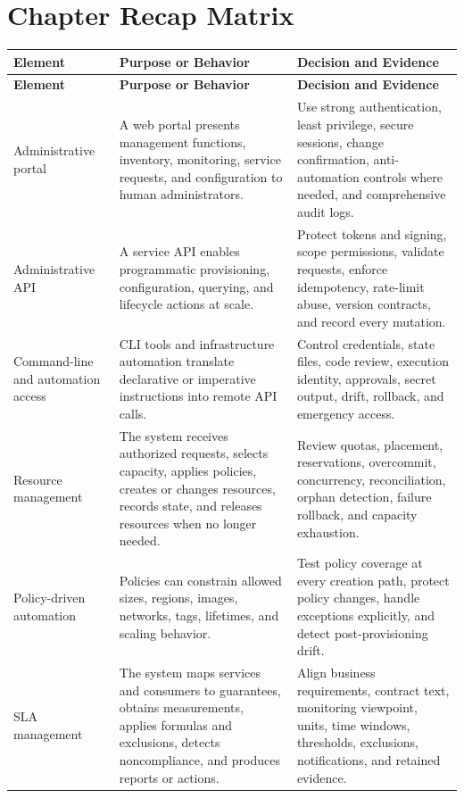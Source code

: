 \documentclass[11pt]{article}
\begin{document}
\section{Chapter Recap Matrix}
\begingroup\small\setlength{\tabcolsep}{4pt}
\begin{longtable}{@{}>{\RaggedRight\arraybackslash}p{}>{\RaggedRight\arraybackslash}p{}>{\RaggedRight\arraybackslash}p{}@{}}
\toprule\rowcolor{Navy}\color{white}\textbf{Element} & \color{white}\textbf{Purpose or Behavior} & \color{white}\textbf{Decision and Evidence}\\\midrule\endfirsthead
\toprule\rowcolor{Navy}\color{white}\textbf{Element} & \color{white}\textbf{Purpose or Behavior} & \color{white}\textbf{Decision and Evidence}\\\midrule\endhead
Administrative portal & A web portal presents management functions, inventory, monitoring, service requests, and configuration to human administrators. & Use strong authentication, least privilege, secure sessions, change confirmation, anti-automation controls where needed, and comprehensive audit logs. \\\midrule
Administrative API & A service API enables programmatic provisioning, configuration, querying, and lifecycle actions at scale. & Protect tokens and signing, scope permissions, validate requests, enforce idempotency, rate-limit abuse, version contracts, and record every mutation. \\\midrule
Command-line and automation access & CLI tools and infrastructure automation translate declarative or imperative instructions into remote API calls. & Control credentials, state files, code review, execution identity, approvals, secret output, drift, rollback, and emergency access. \\\midrule
Resource management & The system receives authorized requests, selects capacity, applies policies, creates or changes resources, records state, and releases resources when no longer needed. & Review quotas, placement, reservations, overcommit, concurrency, reconciliation, orphan detection, failure rollback, and capacity exhaustion. \\\midrule
Policy-driven automation & Policies can constrain allowed sizes, regions, images, networks, tags, lifetimes, and scaling behavior. & Test policy coverage at every creation path, protect policy changes, handle exceptions explicitly, and detect post-provisioning drift. \\\midrule
SLA management & The system maps services and consumers to guarantees, obtains measurements, applies formulas and exclusions, detects noncompliance, and produces reports or actions. & Align business requirements, contract text, monitoring viewpoint, units, time windows, thresholds, exclusions, notifications, and retained evidence. \\\midrule

\end{longtable}
\end{document}
